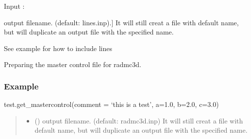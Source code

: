 \documentclass[a4paper,11pt,english]{sphinxmanual}
\begin{document}
\begin{fulllineitems}
\begin{fulllineitems}
\sphinxAtStartPar
Input :
\begin{description}
\sphinxlineitem{filename (string)}{[}output filename. (default: lines.inp).{]}
\sphinxAtStartPar
It will still creat a file with default name,
but will duplicate an output file with the specified name.

\end{description}

\sphinxAtStartPar
See example for how to include lines

\end{fulllineitems}


\begin{fulllineitems}
\label{\detokenize{radmc3d:setup.radmc3d_setup.get_mastercontrol}}
\pysigstartsignatures
\pysiglinewithargsret
{}
{\sphinxparamcomma {}\sphinxparamcomma {}\sphinxparamcomma {}\sphinxparamcomma {}\sphinxparamcomma {}\sphinxparamcomma {}\sphinxparamcomma {}\sphinxparamcomma {}\sphinxparamcomma {}}
{}
\pysigstopsignatures
\sphinxAtStartPar
Preparing the master control file for radmc3d.
\subsubsection*{Example}

\sphinxAtStartPar
test.get\_mastercontrol(comment = ‘this is a test’, a=1.0, b=2.0, c=3.0)
\begin{quote}\begin{description}
\begin{itemize}
\item {} 
\sphinxAtStartPar
{} () \textendash{} output filename. (default: radmc3d.inp)
It will still creat a file with default name, but will duplicate an output file with the specified name.


\end{itemize}
\end{description}
\end{quote}
\end{fulllineitems}
\end{fulllineitems}
\end{document}

